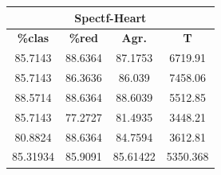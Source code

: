 \documentclass[11pt,a4paper]{article}
\theoremstyle{definition}
\begin{document}
\begin{tabbing}
{		\begin{tabular}{|c|c|c|c|}
			\hline
			\multicolumn{4}{|c|}{\textbf{Spectf-Heart}} \\ \hline
			\textbf{\%clas} & \textbf{\%red} & \textbf{Agr.} & \textbf{T} \\ \hline 
			85.7143	 & 88.6364	&87.1753	 & 6719.91 \\ \hline
85.7143	&  86.3636&	86.039	 & 7458.06 \\ \hline
88.5714	 & 88.6364	&88.6039	 & 5512.85 \\ \hline
85.7143	 & 77.2727	&81.4935	 & 3448.21 \\ \hline
80.8824	 & 88.6364	&84.7594	 & 3612.81 \\ \hline
85.31934&	85.9091	&85.61422	&5350.368 \\ \hline
		\end{tabular}
		}
	\end{tabbing}
	
\end{document}
